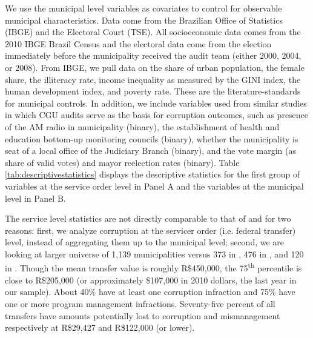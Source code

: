 \documentclass[11pt]{article}
\begin{document}
We use the municipal level variables as covariates to control for observable municipal characteristics. Data come from the Brazilian Office of Statistics (IBGE) and the Electoral Court (TSE). All socioeconomic data comes from the 2010 IBGE Brazil Census and the electoral data come from the election immediately before the municipality received the audit team (either 2000, 2004, or 2008). From IBGE, we pull data on the share of urban population, the female share, the illiteracy rate, income inequality as measured by the GINI index, the human development index, and poverty rate. These are the literature-standards for municipal controls. In addition, we include variables used from similar studies in which CGU audits serve as the basis for corruption outcomes, such as presence of the AM radio in municipality (binary), the establishment of health and education bottom-up monitoring councils (binary), whether the municipality is seat of a local office of the Judiciary Branch (binary), and the vote margin (as share of valid votes) and mayor reelection rates (binary). Table \ref{tab:descriptivestatistics} displays the descriptive statistics for the first group of variables at the service order level in Panel A and the variables at the municipal level in Panel B.



The service level statistics are not directly comparable to that of \citet{FerrazExposingCorruptPoliticians2008b,FerrazElectoralAccountabilityCorruption2011a} and \citet{ZamboniAuditRiskRent2018} for two reasons: first, we analyze corruption at the servicer order (i.e. federal transfer) level, instead of aggregating them up to the municipal level; second, we are looking at larger universe of 1,139 municipalities versus 373 in \citet{FerrazExposingCorruptPoliticians2008b}, 476 in \citet{FerrazElectoralAccountabilityCorruption2011a}, and 120 in \citet{ZamboniAuditRiskRent2018}. Though the mean transfer value is roughly R\$450,000, the 75\textsuperscript{th} percentile is close to R\$205,000 (or approximately \$107,000 in 2010 dollars, the last year in our sample). About 40\% have at least one corruption infraction and 75\% have one or more program management infractions. Seventy-five percent of all transfers have amounts potentially lost to corruption and mismanagement respectively at R\$29,427 and R\$122,000 (or lower).
\end{document}
